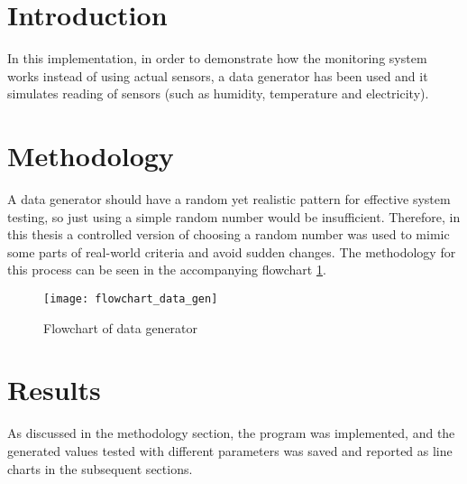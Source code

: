 \section{Introduction}
    In this implementation, in order to demonstrate how the monitoring system works instead of using actual sensors, a data generator has been used and it simulates reading of sensors (such as humidity, temperature and electricity).

\section{Methodology}
A data generator should have a random yet realistic pattern for effective system testing, so just using a simple random number would be insufficient. Therefore, in this thesis a controlled version of choosing a random number was used to mimic some parts of real-world criteria and avoid sudden changes. The methodology for this process can be seen in the accompanying flowchart \ref{chart:data_gen}.

    \begin{figure}
        \centering
        \captionsetup{type=figure}
        \texttt{[image: flowchart\_data\_gen]}
        \caption{Flowchart of data generator}
        \label{chart:data_gen}
    \end{figure}
\section{Results}
    As discussed in the methodology section, the program was implemented, and the generated values tested with different parameters was saved and reported as line charts in the subsequent sections.
